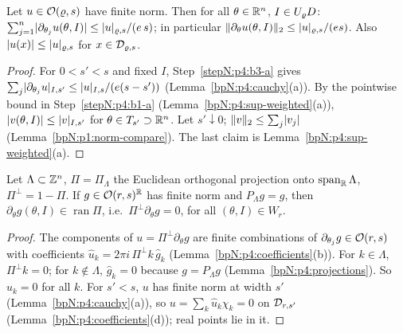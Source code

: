 \begin{lemma}\label{bpN:p7:theta-derivative}
Let $u\in\mathcal O(\varrho,s)$ have finite norm. Then for all $\theta\in\mathbb{R}^n$, $I\in U_{\varrho}D$: $\sum_{j=1}^n\lvert \partial_{\theta_j}u(\theta,I)\rvert\le\lvert u\rvert_{\varrho,s}/(e\,s)$; in particular $\lVert \partial_\theta u(\theta,I)\rVert_2\le\lvert u\rvert_{\varrho,s}/(es)$. Also $\lvert u(x)\rvert\le\lvert u\rvert_{\varrho,s}$ for $x\in\mathcal D_{\varrho,s}$.
\end{lemma}
\begin{proof}
\label{stepN:p7:td-loss} For $0<s'<s$ and fixed $I$, Step~\ref{stepN:p4:b3-a} gives $\sum_j\lvert \partial_{\theta_j}u\rvert_{I,s'}\le\lvert u\rvert_{I,s}/(e(s-s'))$ (Lemma~\ref{bpN:p4:cauchy}(a)). By the pointwise bound in Step~\ref{stepN:p4:b1-a} (Lemma~\ref{bpN:p4:sup-weighted}(a)), $\lvert v(\theta,I)\rvert\le\lvert v\rvert_{I,s'}$ for $\theta\in T_{s'}\supset\mathbb{R}^n$.
\label{stepN:p7:td-lim} Let $s'\downarrow0$; $\lVert v\rVert_2\le\sum_j\lvert v_j\rvert$ (Lemma~\ref{bpN:p1:norm-compare}). The last claim is Lemma~\ref{bpN:p4:sup-weighted}(a).
\end{proof}

\begin{lemma}\label{bpN:p7:resonant-gradient}
Let $\Lambda\subset\mathbb{Z}^n$, $\Pi=\Pi_\Lambda$ the Euclidean orthogonal projection onto $\operatorname{span}_{\mathbb{R}}\Lambda$, $\Pi^\perp=1-\Pi$. If $g\in\mathcal O(r,s)^{\mathbb{R}}$ has finite norm and $P_\Lambda g=g$, then $\partial_\theta g(\theta,I)\in\operatorname{ran}\Pi$, i.e.\ $\Pi^\perp\partial_\theta g=0$, for all $(\theta,I)\in W_r$.
\end{lemma}
\begin{proof}
\label{stepN:p7:rg-coef} The components of $u=\Pi^\perp\partial_\theta g$ are finite combinations of $\partial_{\theta_j}g\in\mathcal O(r,s)$ with coefficients $\hat u_k=2\pi i\,\Pi^\perp k\,\hat g_k$ (Lemma~\ref{bpN:p4:coefficients}(b)). For $k\in\Lambda$, $\Pi^\perp k=0$; for $k\notin\Lambda$, $\hat g_k=0$ because $g=P_\Lambda g$ (Lemma~\ref{bpN:p4:projections}). So $\hat u_k=0$ for all $k$.
\label{stepN:p7:rg-zero} For $s'<s$, $u$ has finite norm at width $s'$ (Lemma~\ref{bpN:p4:cauchy}(a)), so $u=\sum_k\hat u_k\chi_k=0$ on $\mathcal D_{r,s'}$ (Lemma~\ref{bpN:p4:coefficients}(d)); real points lie in it.
\end{proof}

